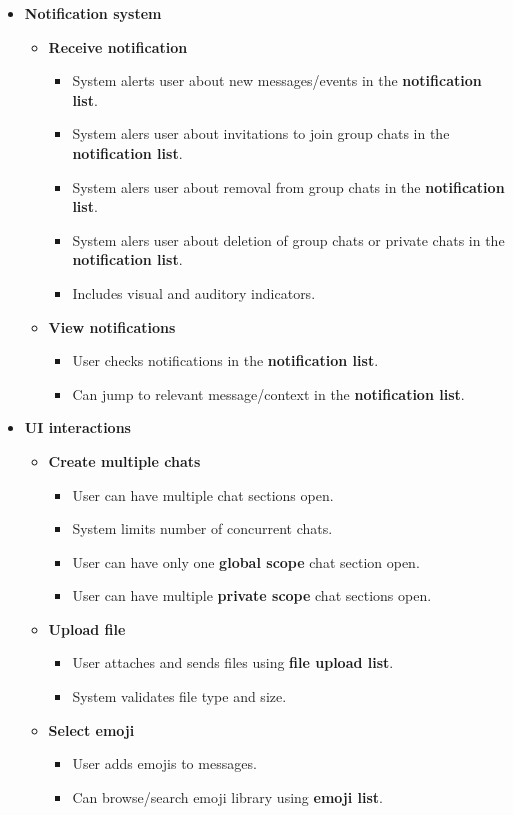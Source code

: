 \documentclass[]{VUMIFTemplateClass}
\begin{document}
\begin{itemize}
    \item \textbf{Notification system}
    \begin{itemize}
        \item \textbf{Receive notification}
        \begin{itemize}
            \item System alerts user about new messages/events in the \textbf{notification list}.
            \item System alers user about invitations to join group chats in the \textbf{notification list}.
            \item System alers user about removal from group chats in the \textbf{notification list}.
            \item System alers user about deletion of group chats or private chats in the \textbf{notification list}.
            \item Includes visual and auditory indicators.
        \end{itemize}
        \item \textbf{View notifications}
        \begin{itemize}
            \item User checks notifications in the \textbf{notification list}.
            \item Can jump to relevant message/context in the \textbf{notification list}.
        \end{itemize}
    \end{itemize}

    \item \textbf{UI interactions}
    \begin{itemize}
        \item \textbf{Create multiple chats}
        \begin{itemize}
            \item User can have multiple chat sections open.
            \item System limits number of concurrent chats.
            \item User can have only one \textbf{global scope} chat section open.
            \item User can have multiple \textbf{private scope} chat sections open.
        \end{itemize}
        \item \textbf{Upload file}
        \begin{itemize}
            \item User attaches and sends files using \textbf{file upload list}.
            \item System validates file type and size.
        \end{itemize}
        \item \textbf{Select emoji}
        \begin{itemize}
            \item User adds emojis to messages.
            \item Can browse/search emoji library using \textbf{emoji list}.
        \end{itemize}
    \end{itemize}


\end{itemize}
\end{document}
